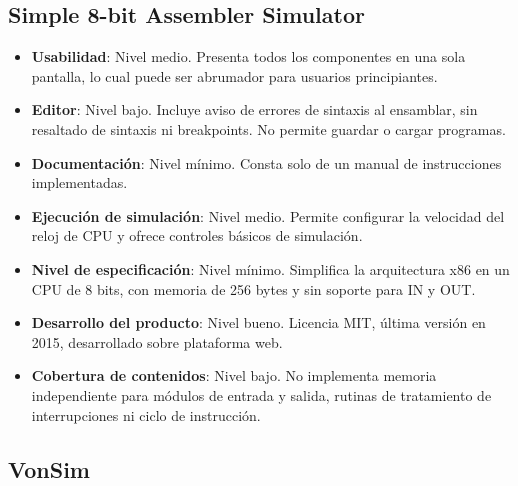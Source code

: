 \documentclass[12pt,twoside]{templates/unerthesis}
\providecommand{\tightlist}{%
  \setlength{\itemsep}{0pt}\setlength{\parskip}{0pt}}
\begin{document}
\hypertarget{simple-8-bit-assembler-simulator}{%
\subsection{Simple 8-bit Assembler Simulator}\label{simple-8-bit-assembler-simulator}}

\begin{itemize}
\tightlist
\item
  \textbf{Usabilidad}: Nivel medio. Presenta todos los componentes en una sola pantalla, lo cual puede ser abrumador para usuarios principiantes.
\item
  \textbf{Editor}: Nivel bajo. Incluye aviso de errores de sintaxis al ensamblar, sin resaltado de sintaxis ni breakpoints. No permite guardar o cargar programas.
\item
  \textbf{Documentación}: Nivel mínimo. Consta solo de un manual de instrucciones implementadas.
\item
  \textbf{Ejecución de simulación}: Nivel medio. Permite configurar la velocidad del reloj de CPU y ofrece controles básicos de simulación.
\item
  \textbf{Nivel de especificación}: Nivel mínimo. Simplifica la arquitectura x86 en un CPU de 8 bits, con memoria de 256 bytes y sin soporte para IN y OUT.
\item
  \textbf{Desarrollo del producto}: Nivel bueno. Licencia MIT, última versión en 2015, desarrollado sobre plataforma web.
\item
  \textbf{Cobertura de contenidos}: Nivel bajo. No implementa memoria independiente para módulos de entrada y salida, rutinas de tratamiento de interrupciones ni ciclo de instrucción.
\end{itemize}

\hypertarget{vonsim}{%
\subsection{VonSim}\label{vonsim}}
\end{document}
